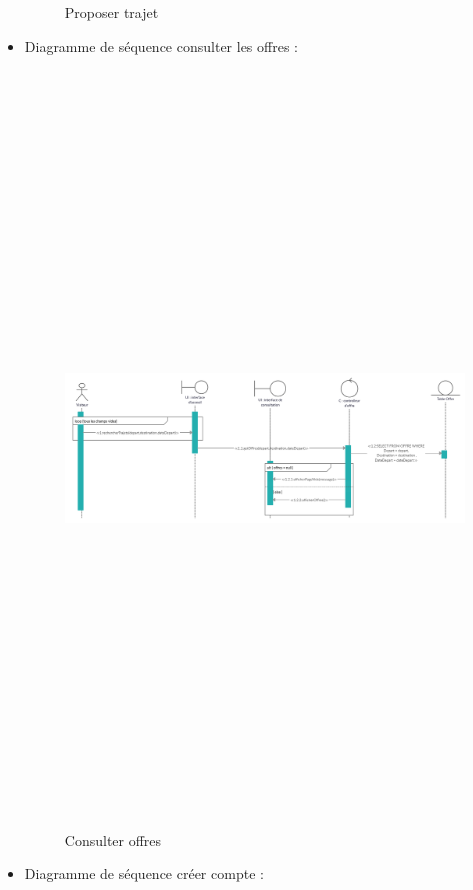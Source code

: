 \documentclass[a4paper]{report}
\begin{document}
\begin{spacing}{2}
\begin{itemize}
\begin{figure}[!ht]
\begin{center}
\end{center}
\caption[Proposer trajet]{Proposer trajet}
\end{figure}
\cleardoublepage
\item Diagramme de séquence consulter les offres :
\begin{figure}[!ht]
\begin{center}
\includegraphics[angle=90,height=20cm]{Projet_JEE/SDconsulterOffres.jpg}
\end{center}
\caption[Consulter offres]{Consulter offres}
\end{figure}
\cleardoublepage
\item Diagramme de séquence créer compte :
\begin{figure}[!ht]
\begin{center}

\end{center}
\end{figure}
\end{itemize}
\end{spacing}
\end{document}
